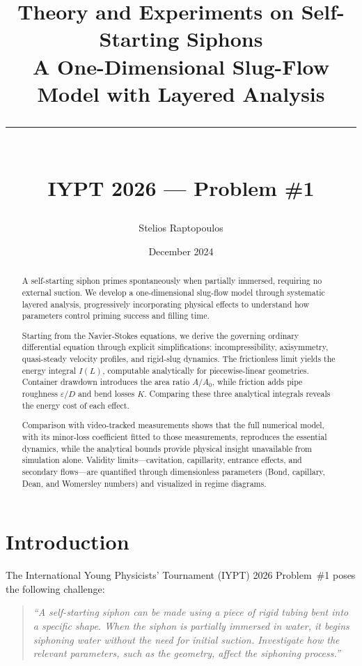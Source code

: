 \documentclass[11pt,a4paper]{article}
\title{\textbf{Theory and Experiments on Self-Starting Siphons}\\[0.5em]
       \large A One-Dimensional Slug-Flow Model with Layered Analysis\\[0.75em]
       \rule{0.6\textwidth}{0.4pt}\\[0.5em]
       \normalsize IYPT 2026 --- Problem \#1}
\author{Stelios Raptopoulos}
\date{December 2024}
\theoremstyle{definition}
\begin{document}
\maketitle

\begin{abstract}
A self-starting siphon primes spontaneously when partially immersed, requiring no external suction. We develop a one-dimensional slug-flow model through systematic layered analysis, progressively incorporating physical effects to understand how parameters control priming success and filling time.

Starting from the Navier-Stokes equations, we derive the governing ordinary differential equation through explicit simplifications: incompressibility, axisymmetry, quasi-steady velocity profiles, and rigid-slug dynamics. The frictionless limit yields the energy integral $I(L)$, computable analytically for piecewise-linear geometries. Container drawdown introduces the area ratio $A/A_0$, while friction adds pipe roughness $\varepsilon/D$ and bend losses $K$. Comparing these three analytical integrals reveals the energy cost of each effect.

Comparison with video-tracked measurements shows that the full numerical model, with its minor-loss coefficient fitted to those measurements, reproduces the essential dynamics, while the analytical bounds provide physical insight unavailable from simulation alone. Validity limits---cavitation, capillarity, entrance effects, and secondary flows---are quantified through dimensionless parameters (Bond, capillary, Dean, and Womersley numbers) and visualized in regime diagrams.
\end{abstract}

\tableofcontents
\newpage

\section{Introduction}
\label{sec:intro}

The International Young Physicists' Tournament (IYPT) 2026 Problem~\#1 poses the following challenge:
\begin{quote}
\emph{``A self-starting siphon can be made using a piece of rigid tubing bent into a specific shape. When the siphon is partially immersed in water, it begins siphoning water without the need for initial suction. Investigate how the relevant parameters, such as the geometry, affect the siphoning process.''}
\end{quote}
\end{document}
